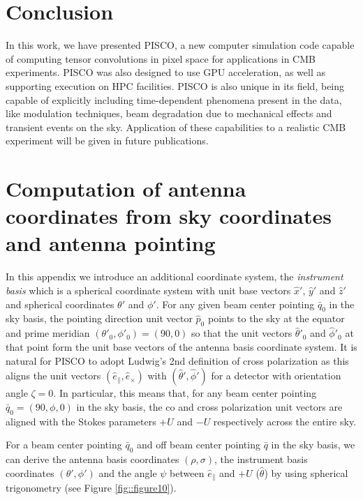 \documentclass[a4paper,11pt]{article}
\newcommand{\co}{\mathbin{\|}}
\newcommand{\cx}{\mathbin{\times}}
\begin{document}
\section{Conclusion}
\label{sec::conclusions}

In this work, we have presented PISCO, a new computer simulation code capable of computing tensor convolutions in pixel space for applications in CMB experiments. PISCO was also designed to use GPU acceleration, as well as supporting execution on HPC facilities. PISCO is also unique in its field, being capable of explicitly including time-dependent phenomena present in the data, like modulation techniques, beam degradation due to mechanical effects and transient events on the sky. Application of these capabilities to a realistic CMB experiment will be given in future publications.




\appendix
\section{Computation of antenna coordinates from sky coordinates and antenna pointing}

In this appendix we introduce an additional coordinate system, the \textsl{instrument basis} which is a spherical coordinate system with unit base vectors $\hat{x}'$, $\hat{y}'$ and $\hat{z}'$ and spherical coordinates $\theta'$ and $\phi'$. For any given beam center pointing $\bar{q}_0$ in the sky basis, the pointing direction unit vector $\hat{p}_0$ points to the sky at the equator and prime meridian $(\theta'_0,\phi'_0) = (90,0)$ so that the unit vectors $\hat{\theta}'_0$ and $\hat{\phi}'_0$ at that point form the unit base vectors of the antenna basis coordinate system. It is natural for PISCO to adopt Ludwig's 2nd definition of cross polarization \cite{1140406} as this aligns the unit vectors $(\hat{e}_{\co},\hat{e}_{\cx})$ with $(\hat{\theta}',\hat{\phi}')$ for a detector with orientation angle $\zeta = 0$. In particular, this means that, for any beam center pointing $\bar{q}_0 = (90,\phi,0)$ in the sky basis, the co and cross polarization unit vectors are aligned with the Stokes parameters $+U$ and $-U$ respectively across the entire sky.

For a beam center pointing $\bar{q}_0$ and off beam center pointing $\bar{q}$ in the sky basis, we can derive the antenna basis coordinates $(\rho,\sigma)$, the instrument basis coordinates $(\theta',\phi')$ and the angle $\psi$ between $\hat{e}_{\co}$ and $+U$ ($\hat{\theta}$) by using spherical trigonometry (see Figure \ref{fig::figure10}). 
\end{document}
